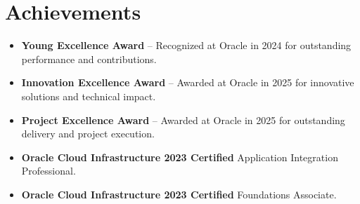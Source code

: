\documentclass[letterpaper,11pt]{article}
\newcommand{\resumeItem}[1]{
  \item\small{
    {#1 \vspace{-2pt}}
  }
}
\newcommand{\resumeItemListStart}{\begin{itemize}}
\newcommand{\resumeItemListEnd}{\end{itemize}\vspace{-5pt}}
\begin{document}
\section{Achievements}
\resumeItemListStart
    \resumeItem{\textbf{Young Excellence Award} -- Recognized at Oracle in 2024 for outstanding performance and contributions.}
    \resumeItem{\textbf{Innovation Excellence Award} -- Awarded at Oracle in 2025 for innovative solutions and technical impact.}
    \resumeItem{\textbf{Project Excellence Award} -- Awarded at Oracle in 2025 for outstanding delivery and project execution.}
    \resumeItem{\textbf{Oracle Cloud Infrastructure 2023 Certified} Application Integration Professional.}
    \resumeItem{\textbf{Oracle Cloud Infrastructure 2023 Certified} Foundations Associate.}
\resumeItemListEnd
\end{document}
